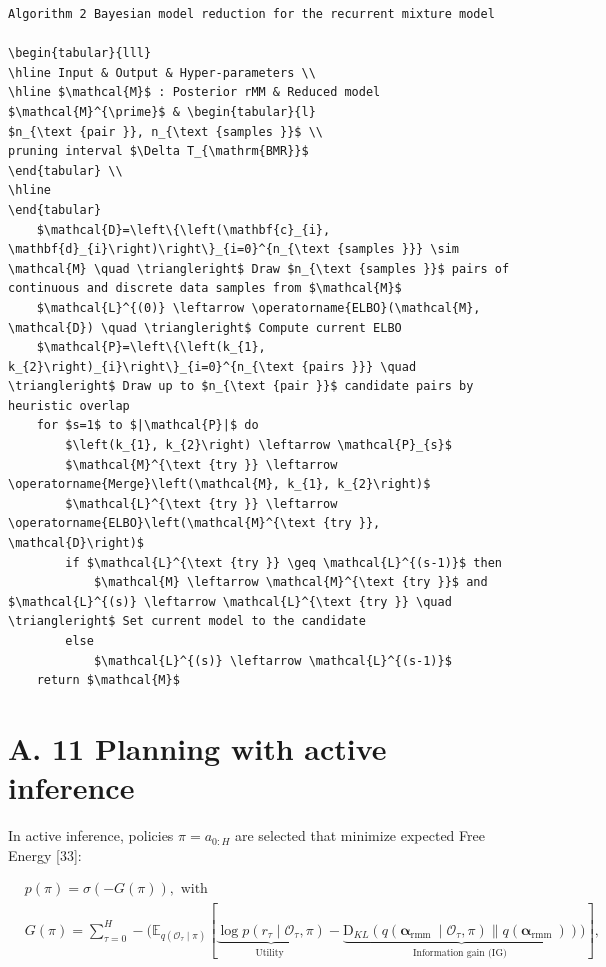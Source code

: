 \documentclass[10pt]{article}
\begin{document}
\begin{verbatim}
Algorithm 2 Bayesian model reduction for the recurrent mixture model

\begin{tabular}{lll}
\hline Input & Output & Hyper-parameters \\
\hline $\mathcal{M}$ : Posterior rMM & Reduced model $\mathcal{M}^{\prime}$ & \begin{tabular}{l}
$n_{\text {pair }}, n_{\text {samples }}$ \\
pruning interval $\Delta T_{\mathrm{BMR}}$
\end{tabular} \\
\hline
\end{tabular}
    $\mathcal{D}=\left\{\left(\mathbf{c}_{i}, \mathbf{d}_{i}\right)\right\}_{i=0}^{n_{\text {samples }}} \sim \mathcal{M} \quad \triangleright$ Draw $n_{\text {samples }}$ pairs of continuous and discrete data samples from $\mathcal{M}$
    $\mathcal{L}^{(0)} \leftarrow \operatorname{ELBO}(\mathcal{M}, \mathcal{D}) \quad \triangleright$ Compute current ELBO
    $\mathcal{P}=\left\{\left(k_{1}, k_{2}\right)_{i}\right\}_{i=0}^{n_{\text {pairs }}} \quad \triangleright$ Draw up to $n_{\text {pair }}$ candidate pairs by heuristic overlap
    for $s=1$ to $|\mathcal{P}|$ do
        $\left(k_{1}, k_{2}\right) \leftarrow \mathcal{P}_{s}$
        $\mathcal{M}^{\text {try }} \leftarrow \operatorname{Merge}\left(\mathcal{M}, k_{1}, k_{2}\right)$
        $\mathcal{L}^{\text {try }} \leftarrow \operatorname{ELBO}\left(\mathcal{M}^{\text {try }}, \mathcal{D}\right)$
        if $\mathcal{L}^{\text {try }} \geq \mathcal{L}^{(s-1)}$ then
            $\mathcal{M} \leftarrow \mathcal{M}^{\text {try }}$ and $\mathcal{L}^{(s)} \leftarrow \mathcal{L}^{\text {try }} \quad \triangleright$ Set current model to the candidate
        else
            $\mathcal{L}^{(s)} \leftarrow \mathcal{L}^{(s-1)}$
    return $\mathcal{M}$
\end{verbatim}

\section*{A. 11 Planning with active inference}
In active inference, policies $\pi=a_{0: H}$ are selected that minimize expected Free Energy [33]:


\begin{align*}
& p(\pi)=\sigma(-G(\pi)), \text { with } \\
& G(\pi)=\sum_{\tau=0}^{H}-(\mathbb{E}_{q\left(\mathcal{O}_{\tau} \mid \pi\right)}[\underbrace{\log p\left(r_{\tau} \mid \mathcal{O}_{\tau}, \pi\right)}_{\text {Utility }}-\underbrace{\mathrm{D}_{K L}\left(q\left(\boldsymbol{\alpha}_{\text {rmm }} \mid \mathcal{O}_{\tau}, \pi\right) \| q\left(\boldsymbol{\alpha}_{\text {rmm }}\right)\right)}_{\text {Information gain (IG) }})], \tag{57}
\end{align*}
\end{document}
